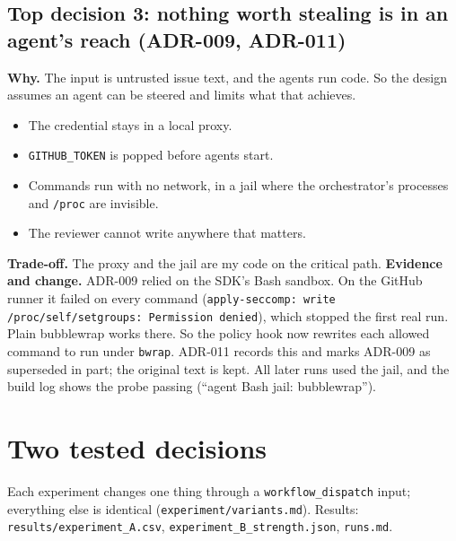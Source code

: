 \documentclass[11pt,a4paper]{article}
\begin{document}
\subsection*{Top decision 3: nothing worth stealing is in an agent's reach (ADR-009, ADR-011)}
\textbf{Why.} The input is untrusted issue text, and the agents run code. So the design assumes an
agent can be steered and limits what that achieves.
\begin{itemize}
\item The credential stays in a local proxy.
\item \texttt{GITHUB\_TOKEN} is popped before agents start.
\item Commands run with no network, in a jail where the orchestrator's processes and \texttt{/proc}
are invisible.
\item The reviewer cannot write anywhere that matters.
\end{itemize}
\textbf{Trade-off.} The proxy and the jail are my code on the critical path. \textbf{Evidence and
change.} ADR-009 relied on the SDK's Bash sandbox. On the GitHub runner it failed on every command
(\texttt{apply-seccomp: write /proc/self/setgroups: Permission denied}), which stopped the first real
run. Plain bubblewrap works there. So the policy hook now rewrites each allowed command to run under
\texttt{bwrap}. ADR-011 records this and marks ADR-009 as superseded in part; the original text is
kept. All later runs used the jail, and the build log shows the probe passing (``agent Bash jail:
bubblewrap'').

\section{Two tested decisions}
Each experiment changes one thing through a \texttt{workflow\_dispatch} input; everything else is
identical (\texttt{experiment/variants.md}). Results: \texttt{results/experiment\_A.csv},
\texttt{experiment\_B\_strength.json}, \texttt{runs.md}.
\end{document}
